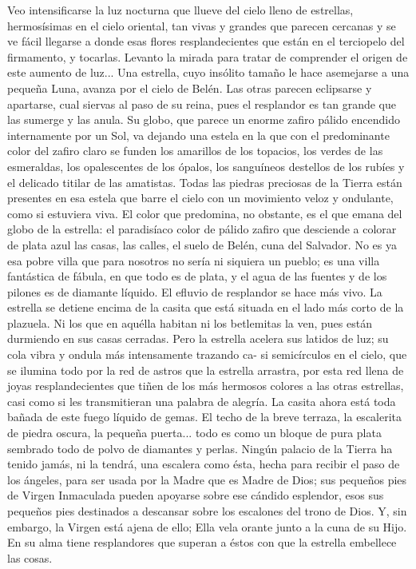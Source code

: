\documentclass[12pt]{book} %
\begin{document}
Veo intensificarse la luz nocturna que llueve del cielo lleno de estrellas, hermosísimas en el cielo oriental, tan vivas y grandes que parecen cercanas y se ve fácil llegarse a donde esas flores resplandecientes que están en el terciopelo del firmamento, y tocarlas. Levanto la mirada para tratar de comprender el origen de este aumento de luz... Una estrella, cuyo insólito tamaño le hace asemejarse a una pequeña Luna, avanza por el cielo de Belén. Las otras parecen eclipsarse y apartarse, cual siervas al paso de su reina, pues el resplandor es tan grande que las sumerge y las anula. Su globo, que parece un enorme zafiro pálido encendido internamente por un Sol, va dejando una estela en la que con el predominante color del zafiro claro se funden los amarillos de los topacios, los verdes de las esmeraldas, los opalescentes de los ópalos, los sanguíneos destellos de los rubíes y el delicado titilar de las amatistas. Todas las piedras preciosas de la Tierra están presentes en esa estela que barre el cielo con un movimiento veloz y ondulante, como si estuviera viva. El color que predomina, no obstante, es el que emana del globo de la estrella: el paradisíaco color de pálido zafiro que desciende a colorar de plata azul las casas, las calles, el suelo de Belén, cuna del Salvador. No es ya esa pobre villa que para nosotros no sería ni siquiera un pueblo; es una villa fantástica de fábula, en que todo es de plata, y el agua de las fuentes y de los pilones es de diamante líquido. 
El efluvio de resplandor se hace más vivo. La estrella se detiene encima de la casita que está situada en el lado más 
corto de la plazuela. Ni los que en aquélla habitan ni los betlemitas la ven, pues están durmiendo en sus casas cerradas. Pero la estrella acelera sus latidos de luz; su cola vibra y ondula más intensamente trazando ca- si semicírculos en el cielo, que se ilumina todo por la red de astros que la estrella arrastra, por esta red llena de joyas resplandecientes que tiñen de los más hermosos colores a las otras estrellas, casi como si les transmitieran una palabra de alegría. 
La casita ahora está toda bañada de este fuego líquido de gemas. El techo de la breve terraza, la escalerita de piedra oscura, la pequeña puerta... todo es como un bloque de pura plata sembrado todo de polvo de diamantes y perlas. Ningún palacio de la Tierra ha tenido jamás, ni la tendrá, una escalera como ésta, hecha para recibir el paso de los ángeles, para ser usada por la Madre que es Madre de Dios; sus pequeños pies de Virgen Inmaculada pueden apoyarse sobre ese cándido esplendor, esos sus pequeños pies destinados a descansar sobre los escalones del trono de Dios. Y, sin embargo, la Virgen está ajena de ello; Ella vela orante junto a la cuna de su Hijo. En su alma tiene resplandores que superan a éstos con que la estrella embellece las cosas. 
\end{document}
